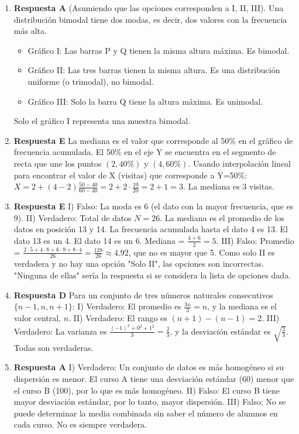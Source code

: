 \documentclass[11pt]{article}
\begin{document}
\begin{enumerate}
    \item \textbf{Respuesta A} (Asumiendo que las opciones corresponden a I, II, III). Una distribución bimodal tiene dos modas, es decir, dos valores con la frecuencia más alta.
    \begin{itemize}
        \item Gráfico I: Las barras P y Q tienen la misma altura máxima. Es bimodal.
        \item Gráfico II: Las tres barras tienen la misma altura. Es una distribución uniforme (o trimodal), no bimodal.
        \item Gráfico III: Solo la barra Q tiene la altura máxima. Es unimodal.
    \end{itemize}
    Solo el gráfico I representa una muestra bimodal. %

    \item \textbf{Respuesta E} La mediana es el valor que corresponde al 50\% en el gráfico de frecuencia acumulada. El 50\% en el eje Y se encuentra en el segmento de recta que une los puntos $(2, 40\%)$ y $(4, 60\%)$. Usando interpolación lineal para encontrar el valor de X (visitas) que corresponde a Y=50\%: $X = 2 + (4-2) \frac{50-40}{60-40} = 2 + 2 \cdot \frac{10}{20} = 2 + 1 = 3$. La mediana es 3 visitas. %

    \item \textbf{Respuesta E} I) Falso: La moda es 6 (el dato con la mayor frecuencia, que es 9). II) Verdadero: Total de datos $N=26$. La mediana es el promedio de los datos en posición 13 y 14. La frecuencia acumulada hasta el dato 4 es 13. El dato 13 es un 4. El dato 14 es un 6. Mediana = $\frac{4+6}{2}=5$. III) Falso: Promedio = $\frac{2\cdot5+4\cdot8+6\cdot9+8\cdot4}{26} = \frac{128}{26} \approx 4.92$, que no es mayor que 5. Como solo II es verdadera y no hay una opción "Solo II", las opciones son incorrectas. "Ninguna de ellas" sería la respuesta si se considera la lista de opciones dada. %
    
    \item \textbf{Respuesta D} Para un conjunto de tres números naturales consecutivos $\{n-1, n, n+1\}$: I) Verdadero: El promedio es $\frac{3n}{3}=n$, y la mediana es el valor central, $n$. II) Verdadero: El rango es $(n+1)-(n-1)=2$. III) Verdadero: La varianza es $\frac{(-1)^2+0^2+1^2}{3}=\frac{2}{3}$, y la desviación estándar es $\sqrt{\frac{2}{3}}$. Todas son verdaderas. %
    
    \item \textbf{Respuesta A} I) Verdadero: Un conjunto de datos es más homogéneo si su dispersión es menor. El curso A tiene una desviación estándar (60) menor que el curso B (100), por lo que es más homogéneo. II) Falso: El curso B tiene mayor desviación estándar, por lo tanto, mayor dispersión. III) Falso: No se puede determinar la media combinada sin saber el número de alumnos en cada curso. No es siempre verdadera. %
        


\end{enumerate}
\end{document}
